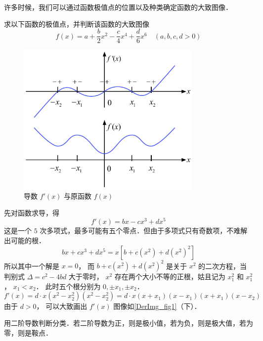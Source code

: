 
许多时候，我们可以通过函数极值点的位置以及种类确定函数的大致图像．

\begin{exam}{}
求以下函数的极值点，并判断该函数的大致图像
\begin{equation}
f(x) = a + \frac{b}{2} x^2 - \frac{c}{4} x^4 + \frac{d}{6} x^6 \quad (a,b,c,d >0)
\end{equation}

\begin{figure}[ht]
\centering
\includegraphics[width=9cm]{./figures/DerImg1.pdf}
\caption{导数 $f'(x)$ 与原函数 $f(x)$}\label{DerImg_fig1}
\end{figure}

先对函数求导，得
\begin{equation}
f'(x) = bx - c x^3 + d x^5
\end{equation}
这是一个 $5$ 次多项式，最多可能有五个零点．但由于多项式只有奇数项，不难解出可能的根．
 \begin{equation}
bx + c x^3 + d x^5 = x[b + c(x^2) + d(x^2)^2 ]
\end{equation}
所以其中一个解是 $x = 0$， 而 $b + c(x^2) + d (x^2)^2$ 是关于 $x^2$ 的二次方程，当判别式 $\Delta  = c^2 - 4bd$ 大于零时， $x^2$ 存在两个大小不等的正根，姑且记为 $x_1^2$ 和 $x_1^2$， $x_1 < x_2$． 
此时五个根分别为 $0, \pm x_1, \pm x_2$． 
\begin{equation}
f'(x) = d \cdot x (x^2 - x_2^2) (x^2 - x_2^2) = d \cdot x (x + x_1)(x - x_1)(x + x_1)(x - x_2)
\end{equation} 
由于 $d > 0$， 可以大致画出 $f'(x)$ 图像如\autoref{DerImg_fig1}（下）．

用二阶导数判断分类．若二阶导数为正，则是极小值，若为负，则是极大值，若为零，则是鞍点．
\end{exam}
